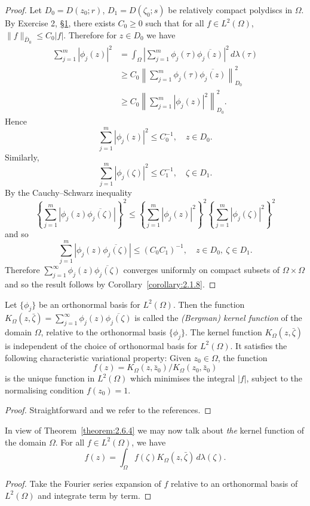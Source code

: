 \begin{proof}
Let $D_0=D(z_0;r)$, $D_1=D(\zeta_0;s)$ be relatively compact polydiscs in $\Omega$. By Exercise 2, \hyperref[sec:2:1]{\S1}, there exists $C_0\geq0$ such that for all $f\in L^2(\Omega)$, $\|f\|_{\bar D_0}\leq C_0|f|$. Therefore for $z\in D_0$ we have
\begin{align*}
\sum_{j=1}^m|\phi_j(z)|^2&=\int_\Omega\left|\sum_{j=1}^m\phi_j(\tau)\overline{\phi_j(z)}\right|^2\,d\lambda(\tau)\\
&\geq C_0\left\|\sum_{j=1}^m\phi_j(\tau)\overline{\phi_j(z)}\right\|_{D_0}^2\\
&\geq C_0\left\|\sum_{j=1}^m|\phi_j(z)|^2\right\|_{D_0}^2.
\end{align*}
Hence
\[\sum_{j=1}^m|\phi_j(z)|^2\leq C_0^{-1},\quad z\in D_0.\]
Similarly,
\[\sum_{j=1}^m|\phi_j(\zeta)|^2\leq C_1^{-1},\quad\zeta\in D_1.\]
By the Cauchy--Schwarz inequality
\[\left\{\sum_{j=1}^m|\phi_j(z)\overline{\phi_j(\zeta)}|\right\}^2\leq\left\{\sum_{j=1}^m|\phi_j(z)|^2\right\}^2\left\{\sum_{j=1}^m|\phi_j(\zeta)|^2\right\}^2\]
and so
\[\sum_{j=1}^m|\phi_j(z)\overline{\phi_j(\zeta)}|\leq(C_0C_1)^{-1},\quad z\in D_0,\ \zeta\in D_1.\]
Therefore $\sum_{j=1}^\infty\phi_j(z)\overline{\phi_j(\zeta)}$ converges uniformly on compact subsets of $\Omega\times\Omega$ and so the result follows by Corollary~\ref{corollary:2.1.8}.
\end{proof}
 Let $\{\phi_j\}$ be an orthonormal basis for $L^2(\Omega)$. Then the function $K_\Omega(z,\bar\zeta)=\sum_{j=1}^\infty\phi_j(z)\overline{\phi_j(\zeta)}$ is called the \emph{(Bergman) kernel function} of the domain $\Omega$, relative to the orthonormal basis $\{\phi_j\}$.
 The kernel function $K_\Omega(z,\bar\zeta)$ is independent of the choice of orthonormal basis for $L^2(\Omega)$. It satisfies the following characteristic variational property:
Given $z_0\in\Omega$, the function
\[f(z)=K_\Omega(z,\bar z_0)/K_\Omega(z_0,\bar z_0)\]
is the unique function in $L^2(\Omega)$ which minimises the integral $|f|$, subject to the normalising condition $f(z_0)=1$.
\begin{proof}
Straightforward and we refer to the references.
\end{proof}
In view of Theorem~\ref{theorem:2.6.4} we may now talk about \emph{the} kernel function of the domain $\Omega$.
 For all $f\in L^2(\Omega)$, we have
\[f(z)=\int_\Omega f(\zeta)K_\Omega(z,\bar\zeta)\,d\lambda(\zeta).\]
\begin{proof}
Take the Fourier series expansion of $f$ relative to an orthonormal basis of $L^2(\Omega)$ and integrate term by term.
\end{proof}
